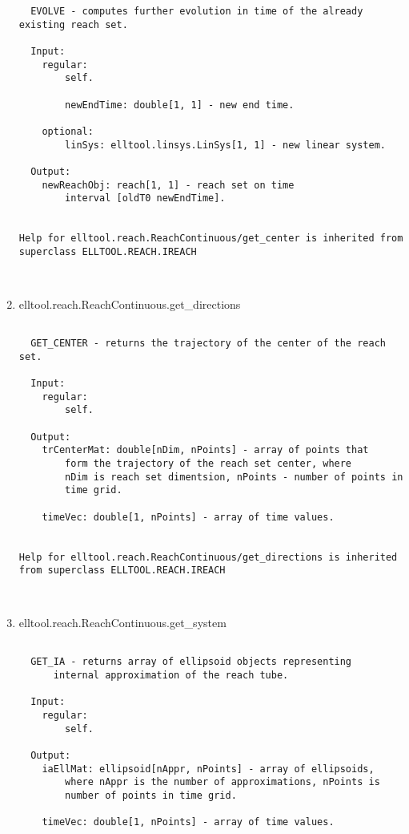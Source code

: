 \begin{enumerate}
\begin{lstlisting}
  EVOLVE - computes further evolution in time of the already existing reach set.

  Input:
    regular:
        self.

        newEndTime: double[1, 1] - new end time.

    optional:
        linSys: elltool.linsys.LinSys[1, 1] - new linear system.

  Output:
    newReachObj: reach[1, 1] - reach set on time
        interval [oldT0 newEndTime].


Help for elltool.reach.ReachContinuous/get_center is inherited from superclass ELLTOOL.REACH.IREACH



\end{lstlisting}
\fontfamily{\familydefault}
\selectfont
\item {elltool.reach.ReachContinuous.get\_directions}
\selectfont
\begin{lstlisting}

  GET_CENTER - returns the trajectory of the center of the reach set.

  Input:
    regular:
        self.

  Output:
    trCenterMat: double[nDim, nPoints] - array of points that
        form the trajectory of the reach set center, where
        nDim is reach set dimentsion, nPoints - number of points in
        time grid.

    timeVec: double[1, nPoints] - array of time values.


Help for elltool.reach.ReachContinuous/get_directions is inherited from superclass ELLTOOL.REACH.IREACH



\end{lstlisting}
\fontfamily{\familydefault}
\selectfont
\item {elltool.reach.ReachContinuous.get\_system}
\selectfont
\begin{lstlisting}

  GET_IA - returns array of ellipsoid objects representing
      internal approximation of the reach tube.

  Input:
    regular:
        self.

  Output:
    iaEllMat: ellipsoid[nAppr, nPoints] - array of ellipsoids,
        where nAppr is the number of approximations, nPoints is
        number of points in time grid.

    timeVec: double[1, nPoints] - array of time values.



\end{lstlisting}
\end{enumerate}
